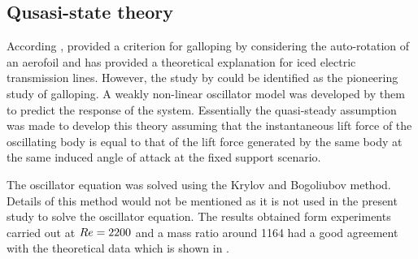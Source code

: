 \subsection{Qusasi-state theory}

According \cite{Paidoussis2010}, \cite{Glauert1919} provided a criterion for galloping by considering the auto-rotation of an aerofoil and \cite{DenHartog1956} has provided a theoretical explanation for iced electric transmission lines. However, the study by \cite{Parkinson1964} could be identified as the pioneering study of galloping. A weakly non-linear oscillator model was developed by them to predict the response of the system. Essentially the quasi-steady assumption was made to develop this theory assuming that the instantaneous lift force of the oscillating body is equal to that of the lift force generated by the same body at the same induced angle of attack at the fixed support scenario.








The oscillator equation was solved using the Krylov and Bogoliubov method. Details of this method would not be mentioned as it is not used in the present study to solve the oscillator equation. The results obtained form experiments carried out at $Re=2200$ and a mass ratio around 1164 had a good agreement with the theoretical data which is shown in .

  


    

     










